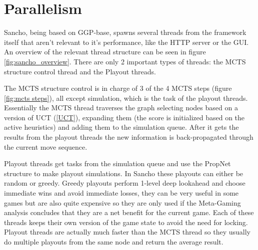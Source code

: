 \section{Parallelism}
Sancho, being based on GGP-base, spawns several threads from the framework itself that aren't relevant to it's performance, like the HTTP server or the GUI.
An overview of the relevant thread structure can be seen in figure \ref{fig:sancho_overview}. There are only 2 important types of threads: the MCTS structure control thread and the Playout threads.

The MCTS structure control is in charge of 3 of the 4 MCTS steps (figure \ref{fig:mcts steps}), all except simulation, which is the task of the playout threads.
Essentially the MCTS thread traverses the graph selecting nodes based on a version of UCT (\ref{UCT}), expanding them (the score is initialized based on the active heuristics) and adding them to the simulation queue. After it gets the results from the playout threads the new information is back-propagated through the current move sequence.

Playout threads get tasks from the simulation queue and use the PropNet structure to make playout simulations. In Sancho these playouts can either be random or greedy. Greedy playouts perform 1-level deep lookahead and choose immediate wins and avoid immediate losses, they can be very useful in some games but are also quite expensive so they are only used if the Meta-Gaming analysis concludes that they are a net benefit for the current game. Each of these threads keeps their own version of the game state to avoid the need for locking. Playout threads are actually much faster than the MCTS thread so they usually do multiple playouts from the same node and return the average result.


